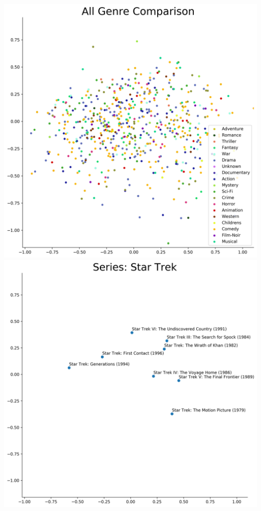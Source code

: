 \includegraphics[scale=0.35]{"All Genre Comparison"}
\includegraphics[scale=0.35]{"Series: Star Trek"} \\ \\
